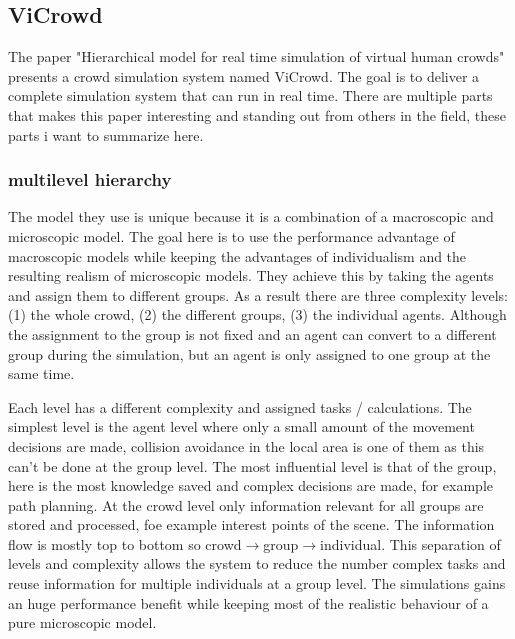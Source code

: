 \documentclass[sigconf]{acmart}
\begin{document}
\subsection{ViCrowd}

The paper "Hierarchical model for real time simulation of virtual human crowds" \cite{musse_hierarchical_2001} presents a crowd simulation system named ViCrowd. 
The goal is to deliver a complete simulation system that can run in real time. 
There are multiple parts that makes this paper interesting and standing out from others in the field, these parts i want to summarize here. 

\subsubsection{multilevel hierarchy}
The model they use is unique because it is a combination of a macroscopic and microscopic model. The goal here is to use the performance advantage of macroscopic models while keeping the advantages of individualism and the resulting realism of microscopic models.
They achieve this by taking the agents and assign them to different groups. As a result there are three complexity levels: (1) the whole crowd, (2) the different groups, (3) the individual agents. Although the assignment to the group is not fixed and an agent can convert to a different group during the simulation, but an agent is only assigned to one group at the same time.

Each level has a different complexity and assigned tasks / calculations. 
The simplest level is the agent level where only a small amount of the movement decisions are made, collision avoidance in the local area is one of them as this can't be done at the group level.
The most influential level is that of the group, here is the most knowledge saved and complex decisions are made, for example path planning.
At the crowd level only information relevant for all groups are stored and processed, foe example interest points of the scene.
The information flow is mostly top to bottom so crowd$\rightarrow$group$\rightarrow$individual.
This separation of levels and complexity allows the system to reduce the number complex tasks and reuse information for multiple individuals at a group level. The simulations gains an huge performance benefit while keeping most of the realistic behaviour of a pure microscopic model. 
\end{document}
